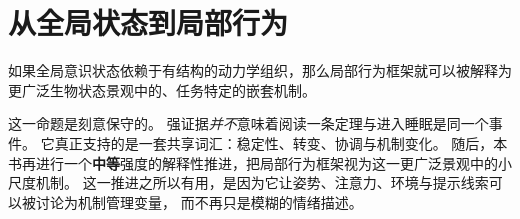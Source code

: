 \section{从全局状态到局部行为}

\begin{proposition}[嵌套状态解释]
如果全局意识状态依赖于有结构的动力学组织，那么局部行为框架就可以被解释为更广泛生物状态景观中的、任务特定的嵌套机制。
\end{proposition}

\begin{discussion}
这一命题是刻意保守的。
强证据\emph{并不}意味着阅读一条定理与进入睡眠是同一个事件。
它真正支持的是一套共享词汇：稳定性、转变、协调与机制变化。
随后，本书再进行一个\textbf{中等}强度的解释性推进，把局部行为框架视为这一更广泛景观中的小尺度机制。
这一推进之所以有用，是因为它让姿势、注意力、环境与提示线索可以被讨论为机制管理变量，
而不再只是模糊的情绪描述。
\end{discussion}